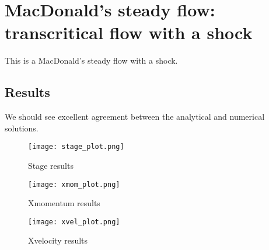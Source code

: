 
\section{MacDonald's steady flow: transcritical flow with a shock}

This is a MacDonald's steady flow with a shock.

\subsection{Results}


We should see excellent agreement between the analytical and numerical solutions.

\begin{figure}[h]
\begin{center}
\texttt{[image: stage\_plot.png]}
\end{center}
\caption{Stage results}
\end{figure}


\begin{figure}[h]
\begin{center}
\texttt{[image: xmom\_plot.png]}
\end{center}
\caption{Xmomentum results}
\end{figure}


\begin{figure}[h]
\begin{center}
\texttt{[image: xvel\_plot.png]}
\end{center}
\caption{Xvelocity results}
\end{figure}


\endinput
